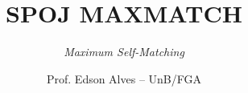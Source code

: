 \title{SPOJ MAXMATCH}
\subtitle{\textit{Maximum Self-Matching}}
\author{Prof. Edson Alves -- UnB/FGA}
\date{}
